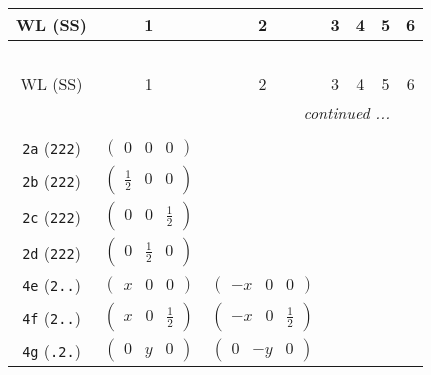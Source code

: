 \documentclass[fleqn,9pt,landscape]{jsarticle}
\begin{document}
\begin{center}
\renewcommand{\arraystretch}{1.2}
\begin{longtable}{ccccccc}
 \hline \hline
WL (SS) & 1 & 2 & 3 & 4 & 5 & 6 \\ \hline \endfirsthead

\multicolumn{6}{l}{\tablename\ \thetable{}} \\
 \hline \hline
WL (SS) & 1 & 2 & 3 & 4 & 5 & 6 \\ \hline \endhead

 \hline \hline
\multicolumn{6}{r}{\footnotesize\it continued ...} \\ \endfoot

 \hline \hline
\multicolumn{6}{r}{} \\ \endlastfoot

{\tt 2a} ({\tt 222}) & $ \begin{pmatrix} 0 & 0 & 0 \end{pmatrix} $ & $  $ & $  $ & $  $ \\ \hline
{\tt 2b} ({\tt 222}) & $ \begin{pmatrix} \frac{1}{2} & 0 & 0 \end{pmatrix} $ & $  $ & $  $ & $  $ \\ \hline
{\tt 2c} ({\tt 222}) & $ \begin{pmatrix} 0 & 0 & \frac{1}{2} \end{pmatrix} $ & $  $ & $  $ & $  $ \\ \hline
{\tt 2d} ({\tt 222}) & $ \begin{pmatrix} 0 & \frac{1}{2} & 0 \end{pmatrix} $ & $  $ & $  $ & $  $ \\ \hline
{\tt 4e} ({\tt 2..}) & $ \begin{pmatrix} x & 0 & 0 \end{pmatrix} $ & $ \begin{pmatrix} - x & 0 & 0 \end{pmatrix} $ & $  $ & $  $ \\ \hline
{\tt 4f} ({\tt 2..}) & $ \begin{pmatrix} x & 0 & \frac{1}{2} \end{pmatrix} $ & $ \begin{pmatrix} - x & 0 & \frac{1}{2} \end{pmatrix} $ & $  $ & $  $ \\ \hline
{\tt 4g} ({\tt .2.}) & $ \begin{pmatrix} 0 & y & 0 \end{pmatrix} $ & $ \begin{pmatrix} 0 & - y & 0 \end{pmatrix} $ & $  $ & $  $ \\ \hline

\end{longtable}
\end{center}
\end{document}
